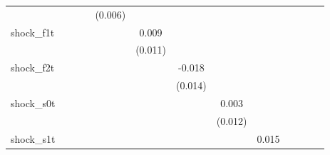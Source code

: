 {\begin{tabular}{l*{12}{c}}
            &                     &                     &                     &     (0.006)         &                     &                     &                     &                     &                     &                     &                     &                     \\
\addlinespace
shock\_f1t   &                     &                     &                     &                     &       0.009         &                     &                     &                     &                     &                     &                     &                     \\
            &                     &                     &                     &                     &     (0.011)         &                     &                     &                     &                     &                     &                     &                     \\
\addlinespace
shock\_f2t   &                     &                     &                     &                     &                     &      -0.018         &                     &                     &                     &                     &                     &                     \\
            &                     &                     &                     &                     &                     &     (0.014)         &                     &                     &                     &                     &                     &                     \\
\addlinespace
shock\_s0t   &                     &                     &                     &                     &                     &                     &       0.003         &                     &                     &                     &                     &                     \\
            &                     &                     &                     &                     &                     &                     &     (0.012)         &                     &                     &                     &                     &                     \\
\addlinespace
shock\_s1t   &                     &                     &                     &                     &                     &                     &                     &       0.015         &                     &                     &                     &                     \\

\end{tabular}}
